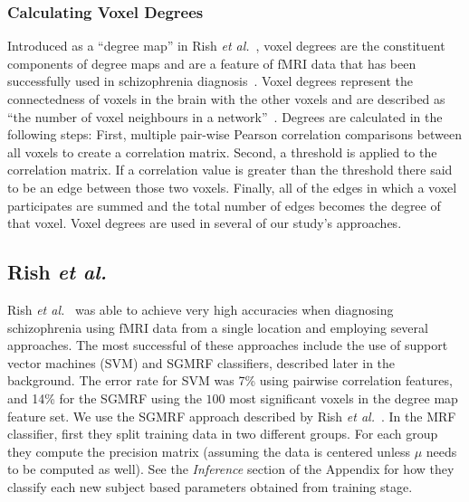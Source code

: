 \documentclass{article} %
\begin{document}
\subsubsection{Calculating Voxel Degrees}
Introduced as a ``degree map'' in Rish 
\emph{et al.}~\cite{rish2009discriminative}, voxel degrees are the constituent
components of degree maps and are a feature of fMRI data that has
been successfully used in schizophrenia diagnosis~\cite{Rish_2013}.
Voxel degrees represent the connectedness of voxels in the brain with the 
other voxels and are described as ``the number of voxel neighbours in a 
network''~\cite{Rish_2013}. Degrees are calculated in the following steps:
First, multiple pair-wise Pearson correlation comparisons between all voxels to 
create a correlation matrix. Second, a threshold is applied to the correlation
matrix. If a correlation value is greater than the threshold there said to be
an edge between those two voxels. Finally, all of the edges in which a voxel
participates are summed and the total number of edges becomes the 
degree of that voxel. Voxel degrees are used in several of our study's 
approaches.

\subsection{Rish \emph{et al.}}
Rish \emph{et al.}~\cite{Rish_2013} was able to achieve very high accuracies 
when diagnosing schizophrenia using fMRI data from a single location and 
employing several approaches. The most successful of these approaches include 
the use of support vector machines (SVM) and SGMRF classifiers, described 
later in the background. The error rate for SVM was 7\% using pairwise 
correlation features, and 14\% for the SGMRF using the $100$ most significant 
voxels in the degree map feature set. We use the SGMRF approach described by 
Rish \emph{et al.}~\cite{Rish_2013}. In the MRF classifier, first they split 
training data in two different groups. For each group they compute the 
precision matrix (assuming the data is centered unless $\mu$ needs to be 
computed as well). See the \textit{Inference} section of the Appendix for how 
they classify each new subject based parameters obtained from training stage.

%
\end{document}
